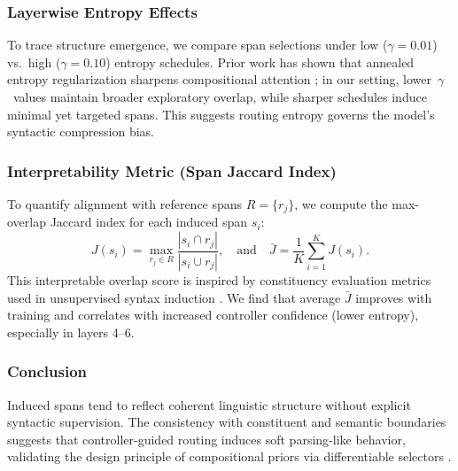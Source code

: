 \subsubsection*{Layerwise Entropy Effects}

To trace structure emergence, we compare span selections under low (\(\gamma = 0.01\)) vs.\ high (\(\gamma = 0.10\)) entropy schedules. Prior work has shown that annealed entropy regularization sharpens compositional attention \cite{pereyra2017regularizing, gupta2022molt}; in our setting, lower~\(\gamma\)~values maintain broader exploratory overlap, while sharper schedules induce minimal yet targeted spans. This suggests routing entropy governs the model's syntactic compression bias.

\subsubsection*{Interpretability Metric (Span Jaccard Index)}

To quantify alignment with reference spans \(R = \{r_j\}\), we compute the max-overlap Jaccard index for each induced span \(s_i\):
\[
J(s_i) = \max_{r_j \in R} \frac{|s_i \cap r_j|}{|s_i \cup r_j|}, \quad \text{and} \quad \bar{J} = \frac{1}{K} \sum_{i=1}^K J(s_i).
\]
This interpretable overlap score is inspired by constituency evaluation metrics used in unsupervised syntax induction \cite{kim2019unsupervised, naradowsky2021structured}. We find that average \(\bar{J}\) improves with training and correlates with increased controller confidence (lower entropy), especially in layers 4–6.

\subsubsection*{Conclusion}

Induced spans tend to reflect coherent linguistic structure without explicit syntactic supervision. The consistency with constituent and semantic boundaries suggests that controller-guided routing induces soft parsing-like behavior, validating the design principle of compositional priors via differentiable selectors \cite{li2021prefix, tay2020sparse}.
